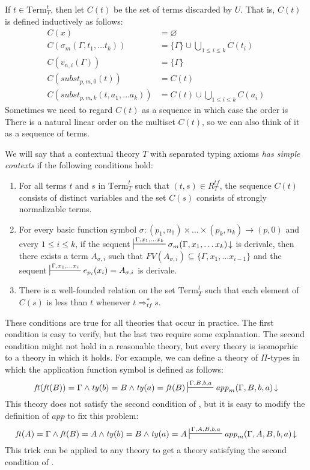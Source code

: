\documentclass[reqno]{amsart}
\theoremstyle{definition}
\theoremstyle{remark}
\newcommand{\Term}{\mathrm{Term}}
\newcommand{\app}{\mathit{app}}
\newcommand{\subst}{\mathit{subst}}
\newcommand{\ft}{\mathit{ft}}
\newcommand{\ty}{\mathit{ty}}
\numberwithin{figure}{section}
\begin{document}
If $t \in \Term_T^t$, then let $C(t)$ be the set of terms discarded by $U$.
That is, $C(t)$ is defined inductively as follows:
\begin{align*}
C(x) & = \varnothing \\
C(\sigma_m(\Gamma, t_1, \ldots t_k)) & = \{ \Gamma \} \cup \bigcup_{1 \leq i \leq k} C(t_i) \\
C(v_{n,i}(\Gamma)) & = \{ \Gamma \} \\
C(\subst_{p,m,0}(t)) & = C(t) \\
C(\subst_{p,m,k}(t, a_1, \ldots a_k)) & = C(t) \cup \bigcup_{1 \leq i \leq k} C(a_i)
\end{align*}
Sometimes we need to regard $C(t)$ as a sequence in which case the order is 
There is a natural linear order on the multiset $C(t)$, so we can also think of it as a sequence of terms.

\begin{defn}
We will say that a contextual theory $T$ with separated typing axioms \emph{has simple contexts} if the following conditions hold:
\begin{enumerate}
\item For all terms $t$ and $s$ in $\Term_T^t$ such that $(t,s) \in R^{tf}_T$, the sequence $C(t)$ consists of distinct variables and the set $C(s)$ consists of strongly normalizable terms.
\item For every basic function symbol $\sigma : (p_1,n_1) \times \ldots \times (p_k,n_k) \to (p,0)$ and every $1 \leq i \leq k$,
if the sequent $\sststile{}{\Gamma, x_1, \ldots x_k} \sigma_m(\Gamma, x_1, \ldots x_k)\!\downarrow$ is derivale,
then there exists a term $A_{\sigma,i}$ such that $FV(A_{\sigma,i}) \subseteq \{ \Gamma, x_1, \ldots x_{i-1} \}$ and the sequent $\sststile{}{\Gamma, x_1, \ldots x_i} e_{p_i}(x_i) = A_{\sigma,i}$ is derivale.
\item There is a well-founded relation on the set $\Term_T^t$ such that each element of $C(s)$ is less than $t$ whenever $t \Rightarrow_{tf}^* s$.
\end{enumerate}
\end{defn}
These conditions are true for all theories that occur in practice.
The first condition is easy to verify, but the last two require some explanation.
The second condition might not hold in a reasonable theory, but every theory is isomoprhic to a theory in which it holds.
For example, we can define a theory of $\Pi$-types in which the application function symbol is defined as follows:
\[ \ft(\ft(B)) = \Gamma \land \ty(b) = B \land \ty(a) = \ft(B) \sststile{}{\Gamma,B,b,a} \app_m(\Gamma,B,b,a)\!\downarrow \]
This theory does not satisfy the second condition of , but it is easy to modify the definition of $\app$ to fix this problem:
\[ \ft(A) = \Gamma \land \ft(B) = A \land \ty(b) = B \land \ty(a) = A \sststile{}{\Gamma,A,B,b,a} \app_m(\Gamma,A,B,b,a)\!\downarrow \]
This trick can be applied to any theory to get a theory satisfying the second condition of .
\end{document}
